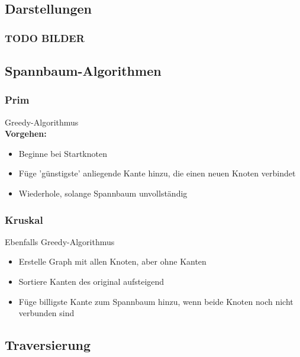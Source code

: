 \documentclass{article}
\begin{document}
	\subsection{Darstellungen}
	\subsubsection{TODO BILDER} %
	\subsection{Spannbaum-Algorithmen}
	\subsubsection{Prim}
	Greedy-Algorithmus
	\\\textbf{Vorgehen:}
	\begin{itemize}
		\item Beginne bei Startknoten
		\item Füge 'günstigste' anliegende Kante hinzu, die einen neuen Knoten verbindet
		\item Wiederhole, solange Spannbaum unvollständig
	\end{itemize}
	\subsubsection{Kruskal}
	Ebenfalls Greedy-Algorithmus
	\begin{itemize}
		\item Erstelle Graph mit allen Knoten, aber ohne Kanten
		\item Sortiere Kanten des original aufsteigend
		\item Füge billigste Kante zum Spannbaum hinzu, wenn beide Knoten noch nicht verbunden sind
	\end{itemize}
	\subsection{Traversierung}
\end{document}
